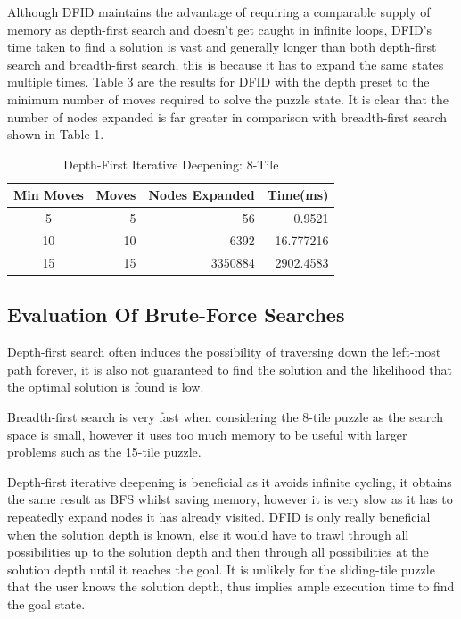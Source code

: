 \documentclass[final]{cmpreport}
\begin{document}
Although DFID maintains the advantage of requiring a comparable supply of memory as depth-first search and doesn't get caught in infinite loops, DFID's time taken to find a solution is vast and generally longer than both depth-first search and breadth-first search, this is because it has to expand the same states multiple times. Table 3 are the results for DFID with the depth preset to the minimum number of moves required to solve the puzzle state. It is clear that the number of nodes expanded is far greater in comparison with breadth-first search shown in Table 1.

\begin{table}[ht]
	\caption{Depth-First Iterative Deepening: 8-Tile}
	\begin{center}
		\begin{tabular}{crrr} \hline
			Min Moves & Moves & Nodes Expanded &Time(ms)  \\ \hline
			5  & 5 & 56 & 0.9521 \\
			10 & 10  &6392&  16.777216 \\ 
			15 & 15 & 3350884& 2902.4583  \\ \hline
		
		\end{tabular}
	\end{center}
\end{table}



\subsection{Evaluation Of Brute-Force Searches}
Depth-first search often induces the possibility of traversing down the left-most path forever, it is also not guaranteed to find the solution and the likelihood that the optimal solution is found is low.

Breadth-first search is very fast when considering the 8-tile puzzle as the search space is small, however it uses too much memory to be useful with larger problems such as the 15-tile puzzle. 

Depth-first iterative deepening is beneficial as it avoids infinite cycling, it obtains the same result as BFS whilst saving memory, however it is very slow as it has to repeatedly expand nodes it has already visited. DFID is only really beneficial when the solution depth is known, else it would have to trawl through all possibilities up to the solution depth and then through all possibilities at the solution depth until it reaches the goal. It is unlikely for the sliding-tile puzzle that the user knows the solution depth, thus implies ample execution time to find the goal state.
\end{document}
